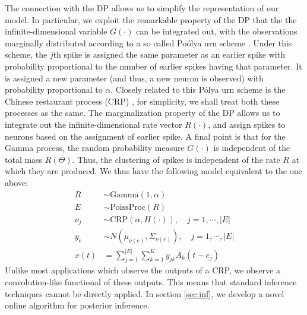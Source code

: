 The connection with the DP allows us to simplify the representation of our model. In particular, we exploit the remarkable property of the DP that
the the infinite-dimensional variable $G(\cdot)$ can be integrated out, with the observations marginally distributed according to a so called
Po\'olya urn scheme \citep{BlaMac1973}. Under this scheme, the $j$th spike is assigned the same parameter as an earlier spike with probability 
proportional to the number of earlier spikes having that parameter. It is assigned a new parameter (and thus, a new neuron is observed) with probability 
proportional to $\alpha$. Closely related to this P\'olya urn scheme is the Chinese restaurant process (CRP) \citep{Pit2002a}, for simplicity,
we shall treat both these processes as the same.
The marginalization property of the DP allows us to integrate out the infinite-dimensional rate vector $R(\cdot)$, and assign spikes to neurons based
on the assignment of earlier spike.
A final point is that for the Gamma process, the random probability measure $G(\cdot)$ is independent of the total mass $R(\Theta)$. 
Thus, the clustering of spikes is independent of the rate $R$ at which they are produced. We thus have
 the following model equivalent to the one above:
\begin{align}
  R & \sim \text{Gamma}(1,\alpha) \\
  E &\sim \text{PoissProc}(R) \\
  \nu_j &\sim \text{CRP}(\alpha, H(\cdot)), \quad j = 1,\cdots, |E|   \label{eq:CRP}\\
  y_e &\sim N(\mu_{\nu(e)}, \Sigma_{\nu(e)}), \quad  j = 1,\cdots, |E|   \label{eq:CRP_mix}\\
  x(t) &=   \sum_{j=1}^{|E|} \sum_{k=1}^K y_{jk} A_k(t - e_{j})
\end{align}
Unlike most applications which observe the outputs of a CRP, we observe a convolution-like functional of these outputs. This means that standard
inference techniques cannot be directly applied. In section \ref{sec:inf}, we develop a novel online algorithm for posterior inference.


